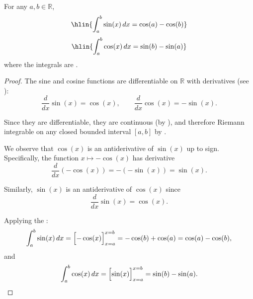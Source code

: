 \begin{proposition} \label{proposition:integrals_of_sine_and_cosine}
For any $a, b \in \mathbb{R}$,
$$\hlin{\int_a^b \sin(x) \, dx = \cos(a) - \cos(b)}$$
$$\hlin{\int_a^b \cos(x) \, dx = \sin(b) - \sin(a)}$$
where the integrals are .
\end{proposition}
\begin{proof}
    The sine and cosine functions are differentiable on $\mathbb{R}$ with derivatives (see ):
    $$\frac{d}{dx} \sin(x) = \cos(x), \qquad \frac{d}{dx} \cos(x) = -\sin(x).$$

    Since they are differentiable, they are continuous (by ), and therefore Riemann integrable on any closed bounded interval $[a, b]$ by .

    We observe that $\cos(x)$ is an antiderivative of $\sin(x)$ up to sign. Specifically, the function $x \mapsto -\cos(x)$ has derivative
    $$\frac{d}{dx}(-\cos(x)) = -(-\sin(x)) = \sin(x).$$

    Similarly, $\sin(x)$ is an antiderivative of $\cos(x)$ since
    $$\frac{d}{dx}\sin(x) = \cos(x).$$

    Applying the :
    $$\int_a^b \sin(x)\,dx = \Bigl[-\cos(x)\Bigr]_{x=a}^{x=b} = -\cos(b) + \cos(a) = \cos(a) - \cos(b),$$
    and
    $$\int_a^b \cos(x)\,dx = \Bigl[\sin(x)\Bigr]_{x=a}^{x=b} = \sin(b) - \sin(a).$$
\end{proof}
